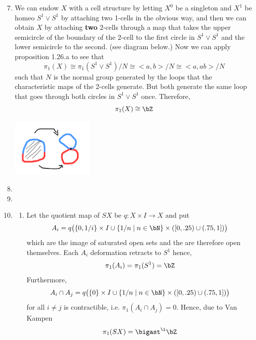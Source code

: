 \documentclass{pset}
\begin{document}
\maketitle

\pagebreak 

\begin{problem}
    \begin{enumerate}[label=1.2.\arabic*]
        \setcounter{enumi}{6}
        \item We can endow $X$ with a cell structure by letting $X^0$ be a singleton and $X^1$ be homeo $S^1 \vee S^1$ by attaching two 1-cells in the obvious way, and then we can obtain $X$ by attaching \textbf{two} 2-cells through a map that takes the upper semicircle of the boundary of the 2-cell to the first circle in $S^1 \vee S^1$ and the lower semicircle to the second. (see diagram below.) Now we can apply proposition 1.26.a to see that
        \[\pi_1(X) \cong \pi_1(S^1 \vee S^1)/N \cong <a, b>/N \cong <a, ab>/N\]
        such that $N$ is the normal group generated by the loops that the characteristic maps of the 2-cells generate. But both generate the same loop that goes through both circles in $S^1 \vee S^1$ once. Therefore,
        \[\pi_1(X) \cong \bZ\]
        
        \includegraphics[width=4cm]{cell attachment.png}
        \setcounter{enumi}{8}
        \item 

        \setcounter{enumi}{16}
        \item 
        \item \begin{enumerate}[label=(\alph*)]
            \item Let the quotient map of $SX$ be $q\colon X\times I \longrightarrow X$ and put 
            \[A_i = q\bigl(\{0, 1/i\} \times I \cup \{1/n \mid n\in\bN\} \times ([0, .25) \cup (.75, 1])\bigr)\]
            which are the image of saturated open sets and the are therefore open themselves. Each $A_i$ deformation retracts to $S^1$ hence,
            \[\pi_1(A_i) = \pi_1(S^1) = \bZ\]
            Furthermore, 
            \[A_i \cap A_j = q\bigl(\{0\} \times I \cup \{1/n \mid n\in\bN\} \times ([0, .25) \cup (.75, 1])\bigr)\]
            for all $i \neq j$ is contractible, i.e. $\pi_1(A_i \cap A_j)=0$. Hence, due to Van Kampen
            \[\pi_1(SX) = \bigast^\i \bZ\]
        \end{enumerate}
    \end{enumerate}
\end{problem}
\end{document}
